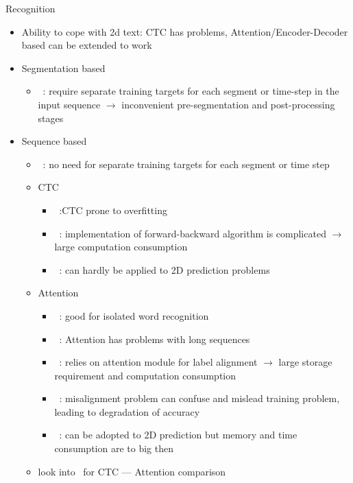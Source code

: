 Recognition
\begin{itemize}
    \item Ability to cope with 2d text:
        CTC has problems,
        Attention/Encoder-Decoder based can be extended to work
    \item Segmentation based
        \begin{itemize}
            \item~\cite{xie_aggregation_2019}: require separate training targets for each segment
                or time-step in the input sequence $\rightarrow$ inconvenient pre-segmentation and
                post-processing stages
        \end{itemize}
    \item Sequence based
        \begin{itemize}
            \item~\cite{xie_aggregation_2019}: no need for separate training targets for each segment
                or time step
            \item CTC
                \begin{itemize}
                    \item~\cite{chen_text_2021}:CTC prone to overfitting
                    \item~\cite{xie_aggregation_2019}: implementation of forward-backward algorithm
                        is complicated $\rightarrow$ large computation consumption
                    \item~\cite{xie_aggregation_2019}: can hardly be applied to 2D prediction
                        problems
                \end{itemize}
            \item Attention
                \begin{itemize}
                    \item~\cite{chen_text_2021}: good for isolated word recognition
                    \item~\cite{chen_text_2021}: Attention has problems with long sequences
                    \item~\cite{xie_aggregation_2019}: relies on attention module for label alignment
                        $\rightarrow$ large storage requirement and computation consumption
                    \item~\cite{xie_aggregation_2019}: misalignment problem can confuse and mislead
                        training problem, leading to degradation of accuracy
                    \item~\cite{xie_aggregation_2019}: can be adopted to 2D prediction but
                        memory and time consumption are to big then
                \end{itemize}
            \item look into~\cite{cong_comparative_2019} for CTC --- Attention comparison
        \end{itemize}
\end{itemize}

